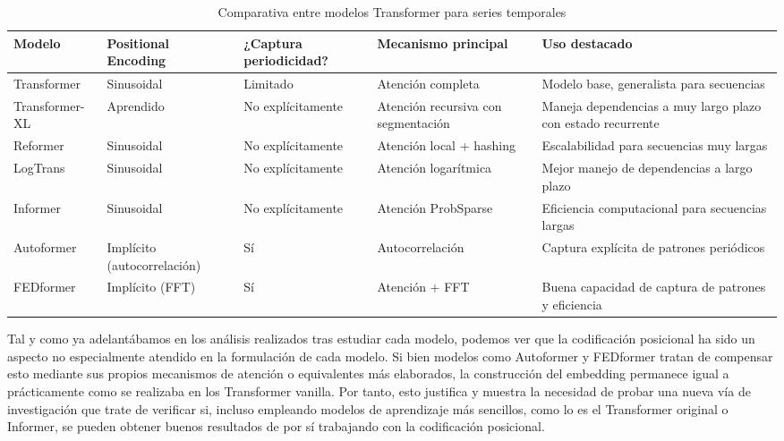 {\begin{table}[!ht]
    \centering
    \begingroup
    \renewcommand{\arraystretch}{1.15}
    \begin{tabular}{P{2.25cm} | P{2cm} P{2cm} P{3cm} P{3.2cm}}
        \toprule
        \textbf{Modelo} & \textbf{Positional Encoding} & \textbf{¿Captura periodicidad?} & \textbf{Mecanismo principal} & \textbf{Uso destacado} \\
        \midrule
        Transformer     & Sinusoidal       & Limitado                        & Atención completa                   & Modelo base, generalista para secuencias                    \\
        Transformer-XL  & Aprendido           & No explícitamente               & Atención recursiva con segmentación & Maneja dependencias a muy largo plazo con estado recurrente \\
        Reformer        & Sinusoidal                   & No explícitamente               & Atención local + hashing            & Escalabilidad para secuencias muy largas                    \\
        LogTrans        & Sinusoidal                   & No explícitamente               & Atención logarítmica                & Mejor manejo de dependencias a largo plazo                  \\
        Informer        & Sinusoidal                   & No explícitamente               & Atención ProbSparse                 & Eficiencia computacional para secuencias largas             \\
        Autoformer      & Implícito (autocorrelación)  & Sí                              & Autocorrelación                     & Captura explícita de patrones periódicos                    \\
        FEDformer       & Implícito (FFT)              & Sí                              & Atención + FFT                      & Buena capacidad de captura de patrones y eficiencia         \\
        \bottomrule
    \end{tabular}
    \caption{Comparativa entre modelos Transformer para series temporales}
    \label{resumenmodelos}
    \endgroup
\end{table}

Tal y como ya adelantábamos en los análisis realizados tras estudiar cada modelo, podemos ver que la codificación posicional ha sido un aspecto no especialmente atendido en la formulación de cada modelo. Si bien modelos como Autoformer y FEDformer tratan de compensar esto mediante sus propios mecanismos de atención o equivalentes más elaborados, la construcción del embedding permanece igual a prácticamente como se realizaba en los Transformer vanilla. Por tanto, esto justifica y muestra la necesidad de probar una nueva vía de investigación que trate de verificar si, incluso empleando modelos de aprendizaje más sencillos, como lo es el Transformer original o Informer, se pueden obtener buenos resultados de por sí trabajando con la codificación posicional.\\

}
